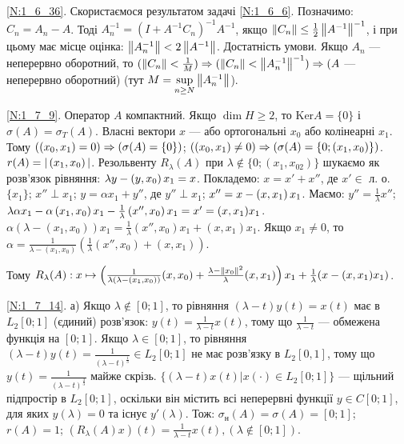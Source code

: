 \noindent\ref{N:1_6_36}. Скористаємося результатом задачі \ref{N:1_6_6}. Позначимо: $C_n = A_n - A$.
Тоді $A_n^{-1} = (I+A^{-1}C_n)^{-1} A^{-1}$, якщо $\left\lVert C_n\right\rVert \leq \frac{1}{2} \left\lVert A^{-1}\right\rVert^{-1}$, і при цьому має місце
оцінка: $\left\lVert A_n^{-1}\right\rVert < 2\left\lVert A^{-1}\right\rVert$.
Достатність умови. Якщо $A_n$ --- неперервно оборотний, то $(\left\lVert C_n\right\rVert<\frac{1}{M}) \Rightarrow (\left\lVert C_n\right\rVert < \left\lVert A_n^{-1}\right\rVert^{-1}) \Rightarrow (A$
 --- неперервно оборотний) (тут $M = \sup\limits_{n \geq N} \left\lVert A_n^{-1}\right\rVert$).

\noindent\ref{N:1_7_9}. Оператор $A$ компактний. Якщо $\dim H \geq 2$, то $\mathrm{Ker} A = \{0\}$ і $\sigma (A) = \sigma_T (A)$.
 Власні вектори $x$ --- або ортогональні $x_0$ або колінеарні $x_1$. Тому 
 $(\left(x_0, x_1\right) = 0) \Rightarrow (\sigma (A) = \{0\})$; 
 $(\left(x_0, x_1\right) \neq 0) \Rightarrow (\sigma(A) = \{0; \left(x_1, x_0\right)\})$. $r(A) = |\left(x_1, x_0\right)|$. 
 Резольвенту $R_{\lambda} (A)$ при $\lambda \notin \{0; (x_1, x_02)\}$ шукаємо як розв'язок рівняння: $\lambda y - \left(y, x_0\right) x_1 = x$.
 Покладемо: $x = x' + x''$, де $x' \in$ л. о. $\{x_1\}$; $x'' \perp x_1$; $y = \alpha x_1 + y''$, де $y'' \perp x_{1}$;
 $x'' = x - \left(x, x_{1}\right)x_{1}$. Маємо: $y'' = \frac{1}{\lambda} x''$; 
 $\lambda \alpha x_1 - \alpha \left(x_1, x_0\right) x_1 - \frac{1}{\lambda}\left(x'', x_0\right)x_1 = x' = (x, x_1)x_1$.
 $\alpha(\lambda - (x_1, x_0))x_1 = \frac{1}{\lambda}(x'', x_0)x_1 + (x, x_1)x_1$.
 Якщо $x_1 \neq 0$, то $\alpha = \frac{1}{\lambda - (x_1, x_0)}\left(\frac{1}{\lambda}(x'', x_0)+(x, x_1)\right)$.
 
 Тому $R_{\lambda} (A): x \mapsto \left(\frac{1}{\lambda(\lambda - (x_1, x_0))}(x, x_0)+\frac{\lambda - \left\lVert x_0\right\rVert^2}{\lambda}(x, x_1)\right)x_1 + \frac{1}{\lambda}(x - (x, x_1)x_1)$.
 
\noindent\ref{N:1_7_14}. а) Якщо $\lambda \notin [0; 1]$, то рівняння $(\lambda - t)y(t) = x(t)$ має в $L_2 [0; 1]$
 (єдиний) розв'язок: $y(t) = \frac{1}{\lambda - t}x(t)$, тому що $\frac{1}{\lambda - t}$ --- обмежена функція на $[0; 1]$.
 Якщо $\lambda \in [0; 1]$, то рівняння $(\lambda - t)y(t) = \frac{1}{(\lambda - t)^{\frac{1}{3}}} \in L_2[0; 1]$ не має розв'язку в $L_2[0,1]$,
 тому що $y(t) = \frac{1}{(\lambda - t)^{\frac{4}{3}}}$ майже скрізь.
 $\{(\lambda - t)x(t) \big| x(\cdot) \in L_2 [0;1]\}$ --- щільний підпростір в $L_2 [0; 1]$, оскільки він містить всі неперервні функції
 $y \in C[0; 1]$, для яких $y(\lambda) = 0$ та існує $y'(\lambda)$. Тож:
 $\sigma_{\text{н}} (A) = \sigma (A) = [0; 1]$; $r(A) = 1$; $(R_{\lambda} (A)x)(t) = \frac{1}{\lambda - t}x(t), (\lambda \notin [0;1])$.

